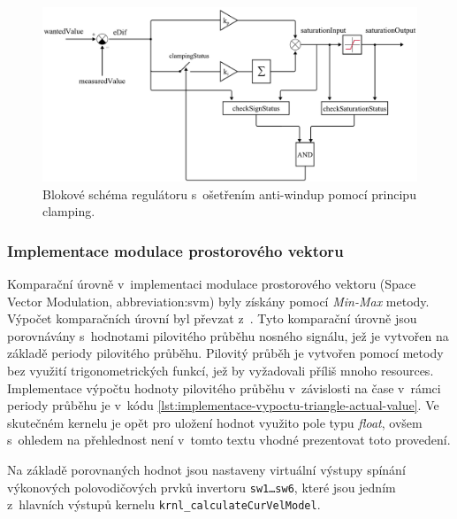 \documentclass[a4paper, twoside, 11pt]{article}
\begin{document}
			\begin{figure}[htbp!]
				\centering
				\includegraphics[width=1\textwidth]{src/pdf/regulator-scheme.pdf}
			   \caption{Blokové schéma regulátoru s~ošetřením anti-windup pomocí principu clamping.}
				\label{fig:regulator-scheme}
		  \end{figure}

		  \subsubsection{Implementace modulace prostorového vektoru}
		  	Komparační úrovně v~implementaci modulace prostorového vektoru (Space Vector Modulation, \gls{abbreviation:svm}) byly získány pomocí \textit{Min-Max} metody. Výpočet komparačních úrovní byl převzat z~\cite{microsemi-svm-min-max-algoritmus}. Tyto komparační úrovně jsou porovnávány s~hodnotami pilovitého průběhu nosného signálu, jež je vytvořen na základě periody pilovitého průběhu. Pilovitý průběh je vytvořen pomocí metody bez využití trigonometrických funkcí, jež by vyžadovali příliš mnoho resources. Implementace výpočtu hodnoty pilovitého průběhu v~závislosti na čase v~rámci periody průběhu je v~kódu \ref{lst:implementace-vypoctu-triangle-actual-value}. Ve skutečném kernelu je opět pro uložení hodnot využito pole typu \textit{float}, ovšem s~ohledem na přehlednost není v~tomto textu vhodné prezentovat toto provedení.\par
			Na základě porovnaných hodnot jsou nastaveny virtuální výstupy spínání výkonových polovodičových prvků invertoru \texttt{sw1\dots sw6}, které jsou jedním z~hlavních výstupů kernelu \texttt{krnl\_calculateCurVelModel}.
\end{document}
